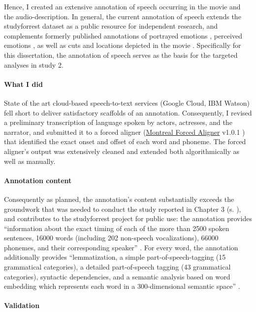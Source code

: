 %
Hence, I created an extensive annotation of speech occurring in the movie and
the audio-description.
%
In general, the current annotation of speech extends the studyforrest dataset
as a public resource for independent research, and complements formerly
published annotations of portrayed emotions \citep{labs2015portrayed}, perceived
emotions \citep{lettieri2019emotionotopy}, as well as cuts and locations
depicted in the movie \citep{haeusler2016cutanno}.
%
Specifically for this dissertation, the annotation of speech serves as the basis
for the targeted analyses in study 2.


\paragraph{What I did}
State of the art cloud-based speech-to-text services (Google Cloud, IBM Watson)
fell short to deliver satisfactory scaffolds of an annotation.
Consequently, I revised a preliminary transcription of language spoken by
actors, actresses, and the narrator, and submitted it to a forced aligner
(\href{https://github.com/MontrealCorpusTools/Montreal-Forced-Aligner}{Montreal
Forced Aligner} v1.0.1 \citep{mcauliffe2017montreal}) that identified the exact
onset and offset of each word and phoneme. The forced aligner's output was
extensively cleaned and extended both algorithmically as well as manually.


\paragraph{Annotation content}
%
Consequently as planned, the annotation's content substantially exceeds the
groundwork that was needed to conduct the study reported in Chapter 3 (s.
\citep{haeusler2022processing}), and contributes to the studyforrest project for
public use:
the annotation provides ``information about the exact timing of each of the more
than 2500 spoken sentences, 16000 words (including 202 non-speech
vocalizations), 66000 phonemes, and their corresponding speaker''
\citep{haeusler2021speechanno}.
%
For every word, the annotation additionally provides ``lemmatization, a simple
part-of-speech-tagging (15 grammatical categories), a detailed part-of-speech
tagging (43 grammatical categories), syntactic dependencies, and a semantic
analysis based on word embedding which represents each word in a 300-dimensional
semantic space'' \citep{haeusler2021speechanno}.


\paragraph{Validation}

